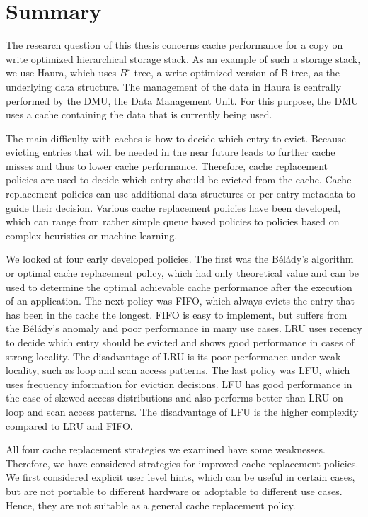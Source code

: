 \documentclass[
	12pt,
	a4paper,
	abstract,
	bibliography=totoc,
	chapterprefix,
	headings=openright,
	numbers=endperiod,
	parskip=half,
	twoside,
]{scrreprt}
\begin{document}
\section{Summary}
\label{sec:summary}

The research question of this thesis concerns cache performance for a copy on write optimized hierarchical storage stack.
As an example of such a storage stack, we use Haura, which uses $B^{\varepsilon}$-tree, a write optimized version of B-tree,
as the underlying data structure.
The management of the data in Haura is centrally performed by the DMU, the Data Management Unit.
For this purpose, the DMU uses a cache containing the data that is currently being used. 

The main difficulty with caches is how to decide which entry to evict.
Because evicting entries that will be needed in the near future leads to further 
cache misses and thus to lower cache performance.
Therefore, cache replacement policies are used to decide which entry should be evicted from the cache.
Cache replacement policies can use additional data structures or per-entry metadata to guide their decision.
Various cache replacement policies have been developed, which can range from rather simple queue 
based policies to policies based 
on complex heuristics or machine learning.

We looked at four early developed policies.
The first was  the Bélády's algorithm or optimal cache replacement policy,
which had only theoretical value and can be used to determine the optimal achievable cache performance 
after the execution of an application.
The next policy was FIFO, which always evicts the entry that has been in the cache the longest.
FIFO is easy to implement, but suffers from the Bélády's anomaly and poor performance in many use cases. 
LRU uses recency to decide which entry should be evicted and shows good performance in cases of strong locality.
The disadvantage of LRU is its poor performance under weak locality, such as loop and scan access patterns.
The last policy was LFU, which uses frequency information for eviction decisions.
LFU has good performance in the case of skewed access distributions and 
also performs better than LRU on loop and scan access patterns.
The disadvantage of LFU is the higher complexity compared to LRU and FIFO.

All four cache replacement strategies we examined have some weaknesses.
Therefore, we have considered strategies for improved cache replacement policies.
We first considered explicit user level hints, which can be useful in certain cases, 
but are not portable to different hardware or adoptable to different use cases.
Hence, they are not suitable as a general cache replacement policy.
\end{document}
